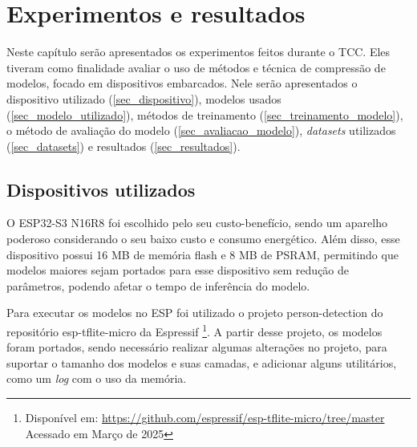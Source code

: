 \chapter{Experimentos e resultados}\label{experimentos}

Neste capítulo serão apresentados os experimentos feitos durante o TCC. Eles tiveram como
finalidade avaliar o uso de métodos e técnica de compressão de modelos, focado em dispositivos
embarcados. Nele serão apresentados o dispositivo utilizado (\autoref{sec_dispositivo}),
modelos usados (\autoref{sec_modelo_utilizado}), métodos de treinamento (\autoref{sec_treinamento_modelo}),
o método de avaliação do modelo (\autoref{sec_avaliacao_modelo}), \textit{datasets} utilizados
(\autoref{sec_datasets}) e resultados (\autoref{sec_resultados}).

\section{Dispositivos utilizados}\label{sec_dispositivo}
%
%
%
O ESP32-S3 N16R8 foi escolhido pelo seu custo-benefício, sendo um aparelho poderoso considerando o seu baixo
custo e consumo energético. Além disso, esse dispositivo possui 16 MB de memória flash e 8 MB de PSRAM,
permitindo que modelos maiores sejam portados para esse dispositivo sem redução de parâmetros, podendo afetar o
tempo de inferência do modelo.

Para executar os modelos no ESP foi utilizado o projeto person-detection do repositório esp-tflite-micro da Espressif
\footnote{Disponível em: \url{https://github.com/espressif/esp-tflite-micro/tree/master} Acessado em Março de 2025}.
A partir desse projeto, os modelos foram portados, sendo necessário realizar algumas alterações no projeto,
para suportar o tamanho dos modelos e suas camadas, e adicionar alguns utilitários, como um \textit{log} com
o uso da memória.

